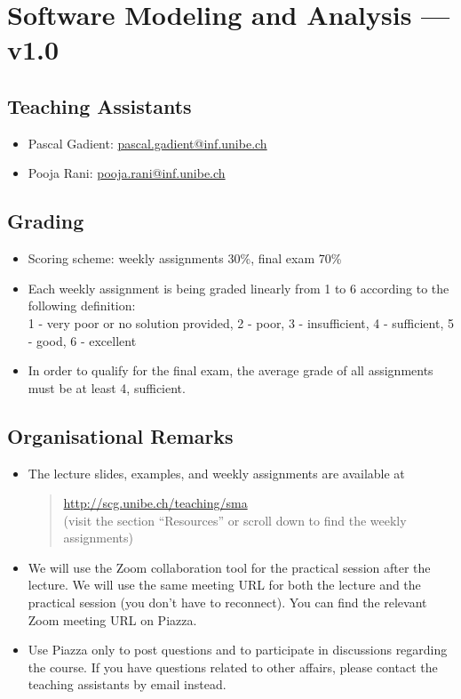 \documentclass [11pt, a4wide, twoside]{article}
\begin{document}
\section*{Software Modeling and Analysis --- v1.0}

\subsection*{Teaching Assistants}
\begin{itemize}
\item{Pascal Gadient:} \href{mailto:pascal.gadient@inf.unibe.ch}{pascal.gadient@inf.unibe.ch}
\item{Pooja Rani:} \href{mailto:pooja.rani@inf.unibe.ch}{pooja.rani@inf.unibe.ch}
\end{itemize}

\subsection*{Grading}
\begin{itemize}
  \item Scoring scheme: weekly assignments 30\%, final exam 70\%
  \item Each weekly assignment is being graded linearly from 1 to 6 according to the following definition:\\1 - very poor or no solution provided, 2 - poor, 3 - insufficient, 4 - sufficient, 5 - good, 6 - excellent
  \item In order to qualify for the final exam, the average grade of all assignments must be at least 4, \ie sufficient.
\end{itemize}

\subsection*{Organisational Remarks}
\begin{itemize}
\item The lecture slides, examples, and weekly assignments are available at
\begin{quote}
\url{http://scg.unibe.ch/teaching/sma}\\(visit the section ``Resources'' or scroll down to find the weekly assignments)
\end{quote}
\item We will use the Zoom collaboration tool for the practical session after the lecture. We will use the same meeting URL for both the lecture and the practical session (you don't have to reconnect). You can find the relevant Zoom meeting URL on Piazza.
\item Use Piazza only to post questions and to participate in discussions regarding the course. If you have questions related to other affairs, please contact the teaching assistants by email instead.
\end{itemize}
\end{document}
